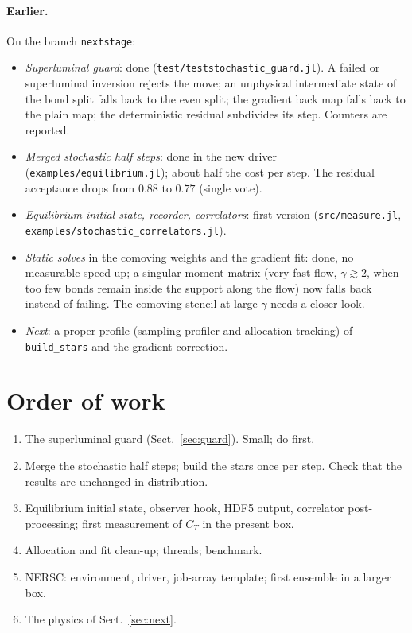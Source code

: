\documentclass[11pt,aps,preprint,nofootinbib,superscriptaddress,tightenlines]{revtex4-2}
\def\Sect#1{Sect.~\ref{#1}}
\let\oldparagraph\paragraph
\renewcommand{\paragraph}{\par\bigskip\oldparagraph}
\begin{document}
\paragraph{Earlier.}

On the branch \texttt{nextstage}:
\begin{itemize}
\item \emph{Superluminal guard}: done (\texttt{test/teststochastic\_guard.jl}).  A
  failed or superluminal inversion rejects the move; an unphysical intermediate
  state of the bond split falls back to the even split; the gradient back map
  falls back to the plain map; the deterministic residual subdivides its step.
  Counters are reported.
\item \emph{Merged stochastic half steps}: done in the new driver
  (\texttt{examples/equilibrium.jl}); about half the cost per step.
  The residual acceptance drops from $0.88$ to $0.77$ (single vote).
\item \emph{Equilibrium initial state, recorder, correlators}: first version
  (\texttt{src/measure.jl}, \texttt{examples/stochastic\_correlators.jl}).
\item \emph{Static solves} in the comoving weights and the gradient fit: done,
  no measurable speed-up; a singular moment matrix (very fast flow, $\gamma\gtrsim2$,
  when too few bonds remain inside the support along the flow) now falls back
  instead of failing.  The comoving stencil at large $\gamma$ needs a closer look.
\item \emph{Next}: a proper profile (sampling profiler and allocation tracking)
  of \texttt{build\_stars} and the gradient correction.
\end{itemize}

\section{Order of work}
\label{sec:order}

\begin{enumerate}
\item The superluminal guard (\Sect{sec:guard}).  Small; do first.
\item Merge the stochastic half steps; build the stars once per step.  Check
  that the results are unchanged in distribution.
\item Equilibrium initial state, observer hook, HDF5 output, correlator
  post-processing; first measurement of $C_T$ in the present box.
\item Allocation and fit clean-up; threads; benchmark.
\item NERSC: environment, driver, job-array template; first ensemble in a
  larger box.
\item The physics of \Sect{sec:next}.
\end{enumerate}
\end{document}
